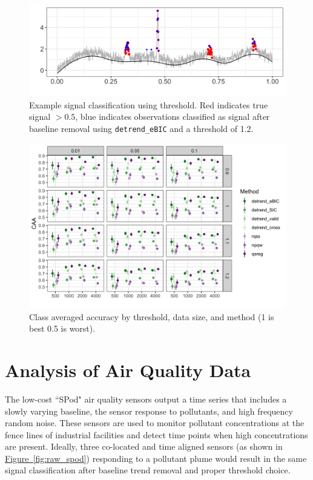 \documentclass[aoas]{imsart}
\newcommand{\Fig}[1]{\hyperref[fig:#1]{Figure~\ref*{fig:#1}}} %
\newcommand{\Fig}[1]{{Figure~\ref{fig:#1}}} %
\begin{document}
\begin{figure}[h!]
	\includegraphics[width = \linewidth]{Figures/peaks_eg_class.png}
	\caption{Example signal classification using threshold. Red indicates true signal $>0.5$, blue indicates observations classified as signal after baseline removal using \texttt{detrend\_eBIC} and a threshold of 1.2.}
	\label{fig:peaks_class_eg}
\end{figure}


\begin{figure}[h!]
	\includegraphics[width = \linewidth]{Figures/peaks_CAA.png}
	\caption{Class averaged accuracy by threshold, data size, and method (1 is best 0.5 is worst).}
\end{figure}


\FloatBarrier

\section{Analysis of Air Quality Data}

\label{sec:application}
The low-cost ``SPod" air quality sensors output a time series that includes a slowly varying baseline,
the sensor response to pollutants, and high frequency random noise. These sensors are used to monitor pollutant concentrations at the fence lines of industrial facilities and detect time points when high concentrations are present. Ideally, three co-located and time aligned sensors (as shown in \Fig{raw_spod}) responding to a pollutant plume would result in the same signal classification after baseline trend removal and proper threshold choice.
\end{document}
